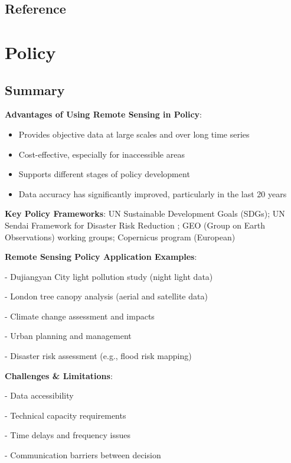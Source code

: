 \documentclass[
  letterpaper,
]{scrbook}
\begin{document}
\section{Reference}\label{reference-1}


\chapter{Policy}\label{policy}

\section{Summary}\label{summary-1}

\textbf{Advantages of Using Remote Sensing in Policy}:

\begin{itemize}
\item
  Provides objective data at large scales and over long time series
\item
  Cost-effective, especially for inaccessible areas
\item
  Supports different stages of policy development
\item
  Data accuracy has significantly improved, particularly in the last 20
  years
\end{itemize}

\textbf{Key Policy Frameworks}: UN Sustainable Development Goals (SDGs);
UN Sendai Framework for Disaster Risk Reduction ; GEO (Group on Earth
Observations) working groups; Copernicus program (European)

\textbf{Remote Sensing Policy Application Examples}:

- Dujiangyan City light pollution study (night light data)

- London tree canopy analysis (aerial and satellite data)

- Climate change assessment and impacts

- Urban planning and management

- Disaster risk assessment (e.g., flood risk mapping)

\textbf{Challenges \& Limitations}:

- Data accessibility

- Technical capacity requirements

- Time delays and frequency issues

- Communication barriers between decision
\end{document}
